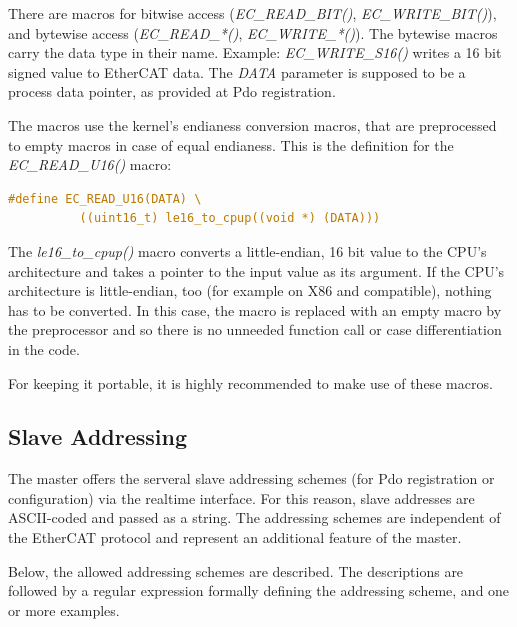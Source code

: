\documentclass[a4paper,12pt,BCOR6mm,bibtotoc,idxtotoc]{scrbook}
\begin{document}
There are macros for bitwise access (\textit{EC\_READ\_BIT()},
\textit{EC\_WRITE\_BIT()}), and bytewise access
(\textit{EC\_READ\_*()}, \textit{EC\_WRITE\_*()}). The bytewise macros
carry the data type in their name. Example: \textit{EC\_WRITE\_S16()}
writes a 16 bit signed value to EtherCAT data. The \textit{DATA}
parameter is supposed to be a process data pointer, as provided at Pdo
registration.

The macros use the kernel's endianess conversion macros, that are
preprocessed to empty macros in case of equal endianess. This is the
definition for the \textit{EC\_\-READ\_\-U16()} macro:

\begin{lstlisting}[language=C]
  #define EC_READ_U16(DATA) \
          ((uint16_t) le16_to_cpup((void *) (DATA)))
\end{lstlisting}

The \textit{le16\_to\_cpup()} macro converts a little-endian, 16 bit
value to the CPU's architecture and takes a pointer to the input value
as its argument. If the CPU's architecture is little-endian, too (for
example on X86 and compatible), nothing has to be converted. In this
case, the macro is replaced with an empty macro by the preprocessor
and so there is no unneeded function call or case differentiation in
the code.

For keeping it portable, it is highly recommended to make use of these
macros.


\subsection{Slave Addressing}
\label{sec:addr}

The master offers the serveral slave addressing schemes (for Pdo
registration or configuration) via the realtime interface. For this
reason, slave addresses are ASCII-coded and passed as a
string. The addressing schemes are independent of the EtherCAT
protocol and represent an additional feature of the master.

Below, the allowed addressing schemes are described. The descriptions
are followed by a regular expression formally defining the addressing
scheme, and one or more examples.
\end{document}
